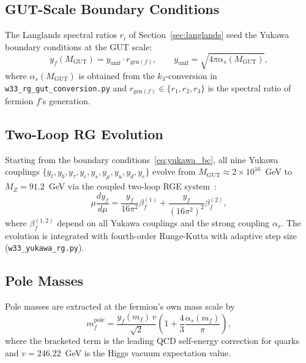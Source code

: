\documentclass[12pt,a4paper]{article}
\newcommand{\MGUT}{M_{\mathrm{GUT}}}
\newcommand{\MZ}{M_Z}
\begin{document}
\subsection{GUT-Scale Boundary Conditions}

The Langlands spectral ratios $r_i$ of Section~\ref{sec:langlands} seed the
Yukawa boundary conditions at the GUT scale:
\begin{equation}
  y_f(\MGUT) = y_{\mathrm{unif}} \cdot r_{\mathrm{gen}(f)},
  \qquad y_{\mathrm{unif}} = \sqrt{4\pi\alpha_s(\MGUT)},
  \label{eq:yukawa_bc}
\end{equation}
where $\alpha_s(\MGUT)$ is obtained from the $k_3$-conversion in
\texttt{w33\_rg\_gut\_conversion.py} and $r_{\mathrm{gen}(f)} \in \{r_1,r_2,r_3\}$
is the spectral ratio of fermion $f$'s generation.

\subsection{Two-Loop RG Evolution}

Starting from the boundary conditions~\eqref{eq:yukawa_bc}, all nine Yukawa
couplings $\{y_t, y_b, y_\tau, y_c, y_s, y_\mu, y_u, y_d, y_e\}$ evolve from
$\MGUT \approx 2\times10^{16}$~GeV to $\MZ = 91.2$~GeV via the coupled
two-loop RGE system~\cite{Machacek1984}:
\begin{equation}
  \mu\frac{d y_f}{d\mu} = \frac{y_f}{16\pi^2}\beta^{(1)}_f
    + \frac{y_f}{(16\pi^2)^2}\beta^{(2)}_f,
  \label{eq:rge}
\end{equation}
where $\beta^{(1,2)}_f$ depend on all Yukawa couplings and the strong coupling
$\alpha_s$. The evolution is integrated with fourth-order Runge-Kutta with
adaptive step size (\texttt{w33\_yukawa\_rg.py}).

\subsection{Pole Masses}

Pole masses are extracted at the fermion's own mass scale by
\begin{equation}
  m_f^{\mathrm{pole}} = \frac{y_f(m_f)\,v}{\sqrt{2}}
    \left(1 + \frac{4}{3}\frac{\alpha_s(m_f)}{\pi}\right),
  \label{eq:pole_mass}
\end{equation}
where the bracketed term is the leading QCD self-energy correction for quarks
and $v = 246.22$~GeV is the Higgs vacuum expectation value.
\end{document}
